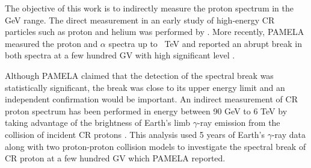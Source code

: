 The objective of this work is to indirectly measure the proton spectrum in 
the GeV range. The direct measurement in an early study of high-energy 
CR particles such as proton and helium was performed
by \cite{bess_experiment}.
More recently, PAMELA measured the proton and $\alpha$ spectra up
to ~TeV and reported an abrupt break in both spectra at a few
hundred GV with high significant level \citep{adriani2011pamela}.


Although PAMELA claimed that the detection of the spectral break
was statistically significant, the break was close to its upper
energy limit and an independent confirmation would be important.
An indirect measurement of CR proton spectrum has been performed in
energy between 90 GeV to 6 TeV by taking advantage of the brightness of
Earth's limb $\gamma$-ray emission from the collision of
incident CR protons \citep{FermiEarth14}.
This analysis used 5 years of Earth's $\gamma$-ray data along with
two proton-proton collision models to investigate the spectral
break of CR proton at a few hundred GV which PAMELA reported.


